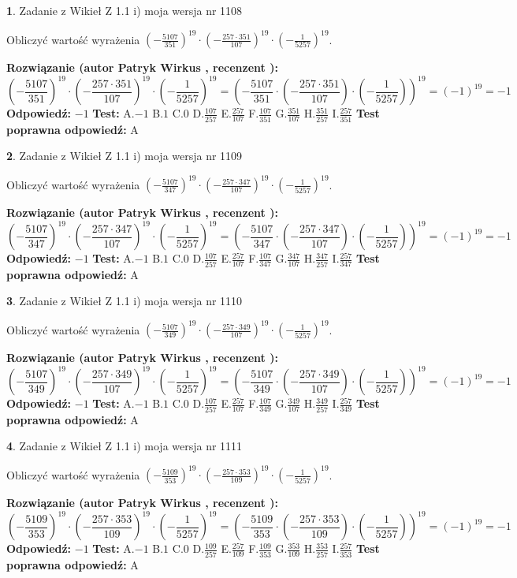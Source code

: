 \documentclass[12pt, a4paper]{article}
\theoremstyle{definition} %
\newtheorem{zad}{}
\newcommand{\zadStart}[1]{\begin{zad}#1\newline}
\newcommand{\zadStop}{\end{zad}}
\newcommand{\rozwStart}[2]{\noindent \textbf{Rozwiązanie (autor #1 , recenzent #2): }\newline}
\newcommand{\rozwStop}{\newline}
\newcommand{\odpStart}{\noindent \textbf{Odpowiedź:}\newline}
\newcommand{\odpStop}{\newline}
\newcommand{\testStart}{\noindent \textbf{Test:}\newline}
\newcommand{\testStop}{\newline}
\newcommand{\kluczStart}{\noindent \textbf{Test poprawna odpowiedź:}\newline}
\newcommand{\kluczStop}{\newline}
\begin{document}
\zadStart{Zadanie z Wikieł Z 1.1 i) moja wersja nr 1108}

Obliczyć wartość wyrażenia $(-\frac{5107}{351})^{19} \cdot (-\frac{257 \cdot 351}{107})^{19} \cdot (-\frac{1}{5257})^{19}$.
\zadStop
\rozwStart{Patryk Wirkus}{}
$$(-\frac{5107}{351})^{19} \cdot (-\frac{257 \cdot 351}{107})^{19} \cdot (-\frac{1}{5257})^{19} = (-\frac{5107}{351} \cdot (-\frac{257 \cdot 351}{107}) \cdot (-\frac{1}{5257}))^{19} = (-1)^{19} = -1$$
\rozwStop
\odpStart
$-1$
\odpStop
\testStart
A.$-1$ B.$1$ C.$0$ D.$\frac{107}{257}$ E.$\frac{257}{107}$
F.$\frac{107}{351}$ G.$\frac{351}{107}$
H.$\frac{351}{257}$
I.$\frac{257}{351}$
\testStop
\kluczStart
A
\kluczStop



\zadStart{Zadanie z Wikieł Z 1.1 i) moja wersja nr 1109}

Obliczyć wartość wyrażenia $(-\frac{5107}{347})^{19} \cdot (-\frac{257 \cdot 347}{107})^{19} \cdot (-\frac{1}{5257})^{19}$.
\zadStop
\rozwStart{Patryk Wirkus}{}
$$(-\frac{5107}{347})^{19} \cdot (-\frac{257 \cdot 347}{107})^{19} \cdot (-\frac{1}{5257})^{19} = (-\frac{5107}{347} \cdot (-\frac{257 \cdot 347}{107}) \cdot (-\frac{1}{5257}))^{19} = (-1)^{19} = -1$$
\rozwStop
\odpStart
$-1$
\odpStop
\testStart
A.$-1$ B.$1$ C.$0$ D.$\frac{107}{257}$ E.$\frac{257}{107}$
F.$\frac{107}{347}$ G.$\frac{347}{107}$
H.$\frac{347}{257}$
I.$\frac{257}{347}$
\testStop
\kluczStart
A
\kluczStop



\zadStart{Zadanie z Wikieł Z 1.1 i) moja wersja nr 1110}

Obliczyć wartość wyrażenia $(-\frac{5107}{349})^{19} \cdot (-\frac{257 \cdot 349}{107})^{19} \cdot (-\frac{1}{5257})^{19}$.
\zadStop
\rozwStart{Patryk Wirkus}{}
$$(-\frac{5107}{349})^{19} \cdot (-\frac{257 \cdot 349}{107})^{19} \cdot (-\frac{1}{5257})^{19} = (-\frac{5107}{349} \cdot (-\frac{257 \cdot 349}{107}) \cdot (-\frac{1}{5257}))^{19} = (-1)^{19} = -1$$
\rozwStop
\odpStart
$-1$
\odpStop
\testStart
A.$-1$ B.$1$ C.$0$ D.$\frac{107}{257}$ E.$\frac{257}{107}$
F.$\frac{107}{349}$ G.$\frac{349}{107}$
H.$\frac{349}{257}$
I.$\frac{257}{349}$
\testStop
\kluczStart
A
\kluczStop



\zadStart{Zadanie z Wikieł Z 1.1 i) moja wersja nr 1111}

Obliczyć wartość wyrażenia $(-\frac{5109}{353})^{19} \cdot (-\frac{257 \cdot 353}{109})^{19} \cdot (-\frac{1}{5257})^{19}$.
\zadStop
\rozwStart{Patryk Wirkus}{}
$$(-\frac{5109}{353})^{19} \cdot (-\frac{257 \cdot 353}{109})^{19} \cdot (-\frac{1}{5257})^{19} = (-\frac{5109}{353} \cdot (-\frac{257 \cdot 353}{109}) \cdot (-\frac{1}{5257}))^{19} = (-1)^{19} = -1$$
\rozwStop
\odpStart
$-1$
\odpStop
\testStart
A.$-1$ B.$1$ C.$0$ D.$\frac{109}{257}$ E.$\frac{257}{109}$
F.$\frac{109}{353}$ G.$\frac{353}{109}$
H.$\frac{353}{257}$
I.$\frac{257}{353}$
\testStop
\kluczStart
A
\kluczStop
\end{document}
